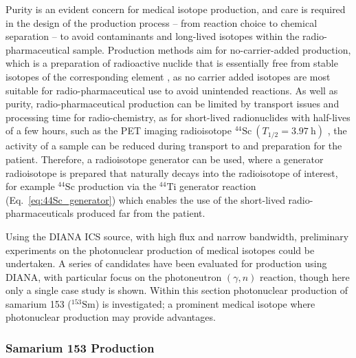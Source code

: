 \documentclass[../main.tex]{subfiles}
\begin{document}
Purity is an evident concern for medical isotope production, and care is required in the design of the production process -- from reaction choice to chemical separation -- to avoid contaminants and long-lived isotopes within the radio-pharmaceutical sample. Production methods aim for no-carrier-added production, which is a preparation of radioactive nuclide that is essentially free from stable isotopes of the corresponding element \cite{currie1994nomenclature,wolf1981synthesis,coenen2017consensus}, as no carrier added isotopes are most suitable for radio-pharmaceutical use to avoid unintended reactions. As well as purity, radio-pharmaceutical production can be limited by transport issues and processing time for radio-chemistry, as for short-lived radionuclides with half-lives of a few hours, such as the PET imaging radioisotope $^{44}\mathrm{Sc}~\left(T_{1/2}=3.97~\si{\hour}\right)$ \cite{roesch2012scandium,muller2014promising}, the activity of a sample can be reduced during transport to and preparation for the patient. Therefore, a radioisotope generator can be used, where a generator radioisotope is prepared that naturally decays into the radioisotope of interest, for example $^{44}\mathrm{Sc}$ production via the $^{44}\mathrm{Ti}$ generator reaction (Eq.~\ref{eq:44Sc_generator}) \cite{roesch2012scandium,muller2014promising} which enables the use of the short-lived radio-pharmaceuticals produced far from the patient.

Using the DIANA ICS source, with high flux and narrow bandwidth, preliminary experiments on the photonuclear production of medical isotopes could be undertaken. A series of candidates have been evaluated for production using DIANA, with particular focus on the photoneutron $\left(\gamma,n\right)$ reaction, though here only a single case study is shown. Within this section photonuclear production of samarium 153 ($^{153}\mathrm{Sm}$) is investigated; a prominent medical isotope where photonuclear production may provide advantages.  

\subsubsection{Samarium 153 Production}
\end{document}
